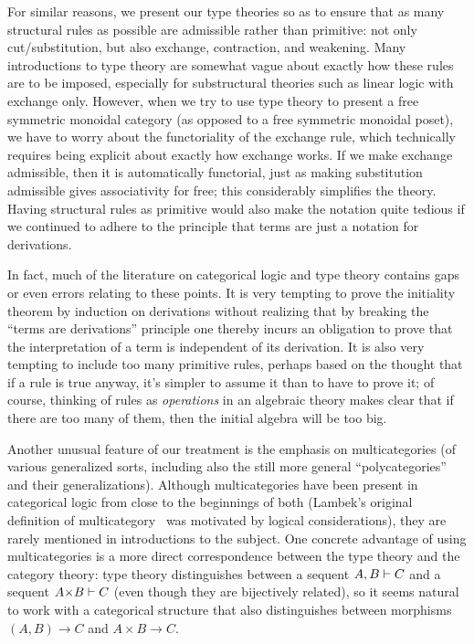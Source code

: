 For similar reasons, we present our type theories so as to ensure that as many structural rules as possible are admissible rather than primitive: not only cut/substitution, but also exchange, contraction, and weakening.
Many introductions to type theory are somewhat vague about exactly how these rules are to be imposed, especially for substructural theories such as linear logic with exchange only.
However, when we try to use type theory to present a free symmetric monoidal category (as opposed to a free symmetric monoidal poset), we have to worry about the functoriality of the exchange rule, which technically requires being explicit about exactly how exchange works.
If we make exchange admissible, then it is automatically functorial, just as making substitution admissible gives associativity for free; this considerably simplifies the theory.
Having structural rules as primitive would also make the notation quite tedious if we continued to adhere to the principle that terms are just a notation for derivations.

In fact, much of the literature on categorical logic and type theory contains gaps or even errors relating to these points.
It is very tempting to prove the initiality theorem by induction on derivations without realizing that by breaking the ``terms are derivations'' principle one thereby incurs an obligation to prove that the interpretation of a term is independent of its derivation.
It is also very tempting to include too many primitive rules, perhaps based on the thought that if a rule is true anyway, it's simpler to assume it than to have to prove it; of course, thinking of rules as \emph{operations} in an algebraic theory makes clear that if there are too many of them, then the initial algebra will be too big.

Another unusual feature of our treatment is the emphasis on multicategories (of various generalized sorts, including also the still more general ``polycategories'' and their generalizations).
Although multicategories have been present in categorical logic from close to the beginnings of both (Lambek's original definition of multicategory~\cite{lambek:dedsys-ii} was motivated by logical considerations), they are rarely mentioned in introductions to the subject.
One concrete advantage of using multicategories is a more direct correspondence between the type theory and the category theory: type theory distinguishes between a sequent $A,B\vdash C$ and a sequent $A\times B\types C$ (even though they are bijectively related), so it seems natural to work with a categorical structure that also distinguishes between morphisms $(A,B)\to C$ and $A\times B\to C$.

